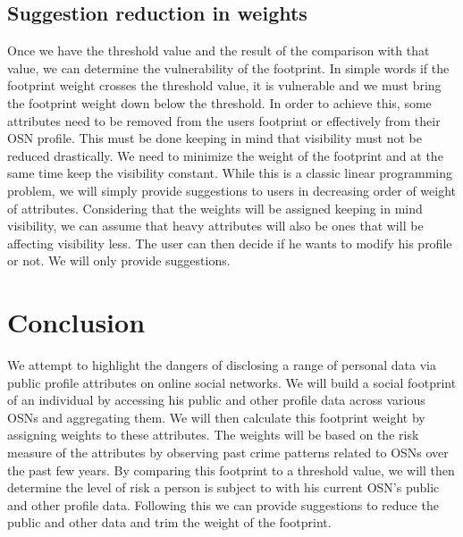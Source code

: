 \documentclass[12pt,conference]{IEEEtran}
\begin{document}
\subsection{Suggestion reduction in weights}
Once we have the threshold value and the result of the comparison with that value, we can determine the vulnerability of the footprint. In simple words if the footprint weight crosses the threshold value, it is vulnerable and we must bring the footprint weight down below the threshold. In order to achieve this, some attributes need to be removed from the users footprint or effectively from their OSN profile. This must be done keeping in mind that visibility must not be reduced drastically. We need to minimize the weight of the footprint and at the same time keep the visibility constant. While this is a classic linear programming problem, we will simply provide suggestions to users in decreasing order of weight of attributes. Considering that the weights will be assigned keeping in mind visibility, we can assume that heavy attributes will also be ones that will be affecting visibility less. The user can then decide if he wants to modify his profile or not. We will only provide suggestions.

\section{Conclusion}
We attempt to highlight the dangers of disclosing a range of personal data via public profile attributes on online social networks. We will build a social footprint of an individual by accessing his public and other profile data across various OSNs and aggregating them. We will then calculate this footprint weight by assigning weights to these attributes. The weights will be based on the risk measure of the attributes by observing past crime patterns related to OSNs over the past few years. By comparing this footprint to a threshold value, we will then determine the level of risk a person is subject to with his current OSN's public and other profile data. Following this we can provide suggestions to reduce the public and other data and trim the weight of the footprint.

\end{document}
